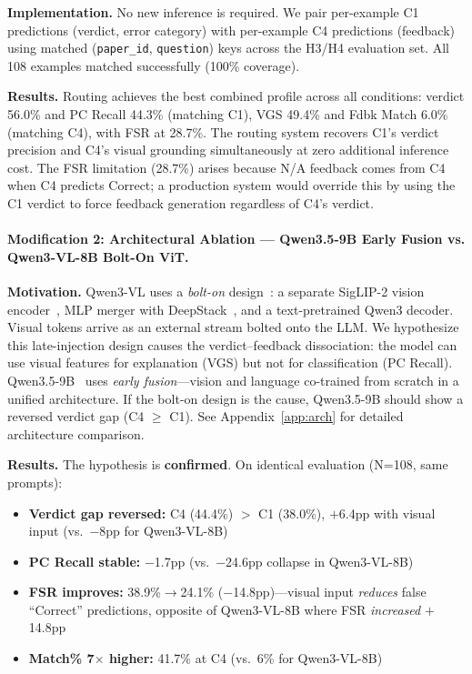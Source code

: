 \documentclass{article}
\begin{document}
\textbf{Implementation.} No new inference is required. We pair per-example C1
predictions (verdict, error category) with per-example C4 predictions (feedback)
using matched (\texttt{paper\_id}, \texttt{question}) keys across the H3/H4
evaluation set. All 108 examples matched successfully (100\% coverage).

\textbf{Results.} Routing achieves the best combined profile across all conditions:
verdict 56.0\% and PC Recall 44.3\% (matching C1), VGS 49.4\% and Fdbk Match
6.0\% (matching C4), with FSR at 28.7\%. The routing system recovers C1's verdict
precision and C4's visual grounding simultaneously at zero additional inference
cost. The FSR limitation (28.7\%) arises because N/A feedback comes from C4 when
C4 predicts Correct; a production system would override this by using the C1
verdict to force feedback generation regardless of C4's verdict.

\paragraph{Modification 2: Architectural Ablation --- Qwen3.5-9B Early Fusion vs. Qwen3-VL-8B Bolt-On ViT.}

\textbf{Motivation.} Qwen3-VL uses a \emph{bolt-on} design~\cite{bai2025qwen3vl}: a
separate SigLIP-2 vision encoder~\cite{zhai2023siglip}, MLP merger with DeepStack~\cite{ge2024deepstack}, and a text-pretrained
Qwen3 decoder. Visual tokens arrive as an external stream bolted onto the LLM.
We hypothesize this late-injection design causes the verdict--feedback dissociation:
the model can use visual features for explanation (VGS) but not for classification
(PC Recall). Qwen3.5-9B~\cite{qwen2026qwen35} uses \emph{early fusion}---vision and
language co-trained from scratch in a unified architecture. If the bolt-on design
is the cause, Qwen3.5-9B should show a reversed verdict gap (C4 $\geq$ C1).
See Appendix~\ref{app:arch} for detailed architecture comparison.

\textbf{Results.} The hypothesis is \textbf{confirmed}. On identical evaluation
(N=108, same prompts):
\begin{itemize}[itemsep=1pt, topsep=2pt, leftmargin=*]
  \item \textbf{Verdict gap reversed:} C4 (44.4\%) $>$ C1 (38.0\%), $+$6.4pp with
    visual input (vs.\ $-$8pp for Qwen3-VL-8B)
  \item \textbf{PC Recall stable:} $-$1.7pp (vs.\ $-$24.6pp collapse in Qwen3-VL-8B)
  \item \textbf{FSR improves:} 38.9\%$\to$24.1\% ($-$14.8pp)---visual input \emph{reduces}
    false ``Correct'' predictions, opposite of Qwen3-VL-8B where FSR \emph{increased} $+$14.8pp
  \item \textbf{Match\% 7$\times$ higher:} 41.7\% at C4 (vs.\ 6\% for Qwen3-VL-8B)
\end{itemize}
\end{document}
